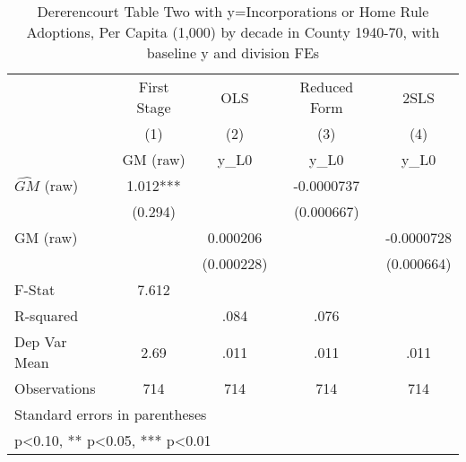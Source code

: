 \begin{table}[htbp]\centering
\def\sym#1{\ifmmode^{#1}\else\(^{#1}\)\fi}
\caption{Dererencourt Table Two with y=Incorporations or Home Rule Adoptions, Per Capita (1,000) by decade in County 1940-70, with baseline y and division FEs}
\begin{tabular}{l*{4}{c}}
\toprule
                    & First Stage   &         OLS   &Reduced Form   &        2SLS   \\
                    &\multicolumn{1}{c}{(1)}&\multicolumn{1}{c}{(2)}&\multicolumn{1}{c}{(3)}&\multicolumn{1}{c}{(4)}\\
                    &\multicolumn{1}{c}{GM  (raw)}&\multicolumn{1}{c}{y\_L0}&\multicolumn{1}{c}{y\_L0}&\multicolumn{1}{c}{y\_L0}\\
\midrule
$\hat{GM}$ (raw)    &       1.012***&               &  -0.0000737   &               \\
                    &     (0.294)   &               &  (0.000667)   &               \\
\addlinespace
GM  (raw)           &               &    0.000206   &               &  -0.0000728   \\
                    &               &  (0.000228)   &               &  (0.000664)   \\
\midrule
F-Stat              &       7.612   &               &               &               \\
R-squared           &               &        .084   &        .076   &               \\
Dep Var Mean        &        2.69   &        .011   &        .011   &        .011   \\
Observations        &         714   &         714   &         714   &         714   \\
\bottomrule
\multicolumn{5}{l}{\footnotesize Standard errors in parentheses}\\
\multicolumn{5}{l}{\footnotesize * p<0.10, ** p<0.05, *** p<0.01}\\
\end{tabular}
\end{table}
